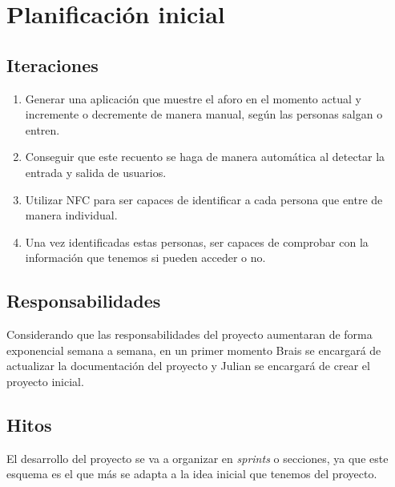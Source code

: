 \documentclass[a4paper,openright,12pt]{article}
\begin{document}
\section{Planificación inicial}

\subsection{Iteraciones}
\begin{enumerate}
    \item Generar una aplicación que muestre el aforo en el momento actual y incremente o decremente de manera manual, según las personas salgan o entren.
    \item Conseguir que este recuento se haga de manera automática al detectar la entrada y salida de usuarios.
    \item Utilizar NFC \cite{NFC} para ser capaces de identificar a cada persona que entre de manera individual.
    \item Una vez identificadas estas personas, ser capaces de comprobar con la información que tenemos si pueden acceder o no.
    
\end{enumerate}

\subsection{Responsabilidades}
Considerando que las responsabilidades del proyecto aumentaran de forma exponencial semana a semana, en un primer momento Brais se encargará de actualizar la documentación del proyecto y Julian se encargará de crear el proyecto inicial.

\subsection{Hitos}
El desarrollo del proyecto se va a organizar en \textit{sprints} o secciones, ya que este esquema es el que más se adapta a la idea inicial que tenemos del proyecto.
\end{document}
